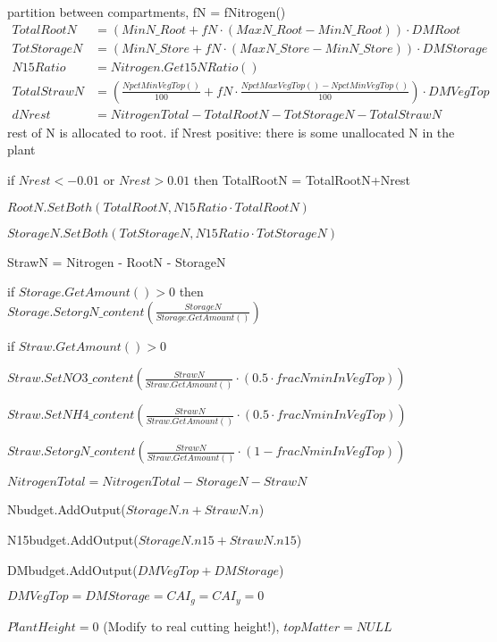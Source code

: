 \documentclass[%
]{scrartcl}
\begin{document}
   partition between compartments,  fN =  fNitrogen()
  \begin{align*}  
  TotalRootN  & = (MinN\_Root +fN  \cdot  (MaxN\_Root-MinN\_Root))   \cdot  DMRoot \\
  TotStorageN & = (MinN\_Store +fN  \cdot  (MaxN\_Store-MinN\_Store))   \cdot  DMStorage \\
   N15Ratio   & =  Nitrogen.Get15NRatio()  \\
   TotalStrawN & =  \left(\tfrac{NpctMinVegTop()}{100} + fN  \cdot  \tfrac{NpctMaxVegTop()-NpctMinVegTop()}{100}\right)  \cdot  DMVegTop \\
   dNrest & = NitrogenTotal - TotalRootN - TotStorageN - TotalStrawN 
\end{align*}
   rest of N is allocated to root.
   if Nrest positive: there is some unallocated N in the plant
   
   if $Nrest<-0.01$ or $Nrest>0.01$ then    
      TotalRootN = TotalRootN+Nrest 
   
   $ RootN.SetBoth(TotalRootN,N15Ratio  \cdot  TotalRootN) $
   
  $ StorageN.SetBoth(TotStorageN,N15Ratio  \cdot  TotStorageN)$
    
   StrawN = Nitrogen - RootN - StorageN 
   
   if $Storage.GetAmount()>0$ then      
   $	Storage.SetorgN\_content\left(\tfrac{StorageN}{Storage.GetAmount()}\right) $
   	
  if $Straw.GetAmount()>0$
  
  \quad $	Straw.SetNO3\_content\left(
        \tfrac{StrawN}{Straw.GetAmount()}  \cdot  (0.5  \cdot  fracNminInVegTop)\right)$
        
   \quad  $ Straw.SetNH4\_content\left(
        \tfrac{StrawN}{Straw.GetAmount()}  \cdot  (0.5  \cdot  fracNminInVegTop)\right)$
        
  \quad  $  Straw.SetorgN\_content\left(
        \tfrac{StrawN}{Straw.GetAmount()}  \cdot  (1-fracNminInVegTop)\right)$
 
$	NitrogenTotal = NitrogenTotal-StorageN-StrawN$

   Nbudget.AddOutput($StorageN.n+StrawN.n$) 
                     
  N15budget.AddOutput($StorageN.n15+StrawN.n15$)
                     
 DMbudget.AddOutput($DMVegTop+DMStorage$)   

	$DMVegTop   = 
	DMStorage   = 
	CAI_g  = 
	CAI_y  = 0 $
	
   $PlantHeight = 0$ (Modify to real cutting height!),   
 $ topMatter = NULL$ 
	
\end{document}
